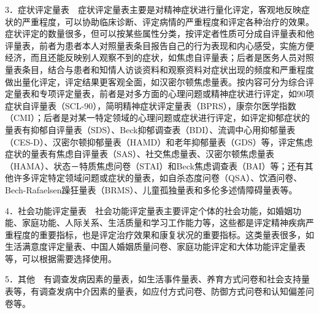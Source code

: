 3．症状评定量表　症状评定量表主要是对精神症状进行量化评定，客观地反映症状的严重程度，可以协助临床诊断、评定病情的严重程度和评定各种治疗的效果。症状评定的数量很多，但可以按某些属性分类，按评定者性质可分成自评量表和他评量表，前者为患者本人对照量表条目报告自己的行为表现和内心感受，实施方便经济，而且还能反映别人观察不到的症状，如焦虑自评量表；后者是医务人员对照量表条目，结合与患者和知情人访谈资料和观察资料对症状出现的频度和严重程度做出量化评定，评定结果更客观全面，如汉密尔顿焦虑量表。按内容可分为综合评定量表和专项评定量表，前者是对多方面的心理问题或精神症状进行评定，如90项症状自评量表（SCL-90），简明精神症状评定量表（BPRS），康奈尔医学指数（CMI）；后者是对某一特定领域的心理问题或症状进行评定，如评定抑郁症状的量表有抑郁自评量表（SDS）、Beck抑郁调查表（BDI）、流调中心用抑郁量表（CES-D）、汉密尔顿抑郁量表（HAMD）和老年抑郁量表（GDS）等，评定焦虑症状的量表有焦虑自评量表（SAS）、社交焦虑量表、汉密尔顿焦虑量表（HAMA）、状态－特质焦虑问卷（STAI）和Beck焦虑调查表（BAI）等；还有其他许多评定特定领域问题或症状的量表，如自杀态度问卷（QSA）、饮酒问卷、Bech-Rafaelsen躁狂量表（BRMS）、儿童孤独量表和多伦多述情障碍量表等。

4．社会功能评定量表　社会功能评定量表主要评定个体的社会功能，如婚姻功能、家庭功能、人际关系、生活质量和学习工作能力等，这些都是评定精神疾病严重程度的重要指标，也是评定治疗效果和康复状况的重要指标。这类量表很多，如生活满意度评定量表、中国人婚姻质量问卷、家庭功能评定和大体功能评定量表等，可以根据需要选择使用。

5．其他　有调查发病因素的量表，如生活事件量表、养育方式问卷和社会支持量表等，有调查发病中介因素的量表，如应付方式问卷、防御方式问卷和认知偏差问卷等。